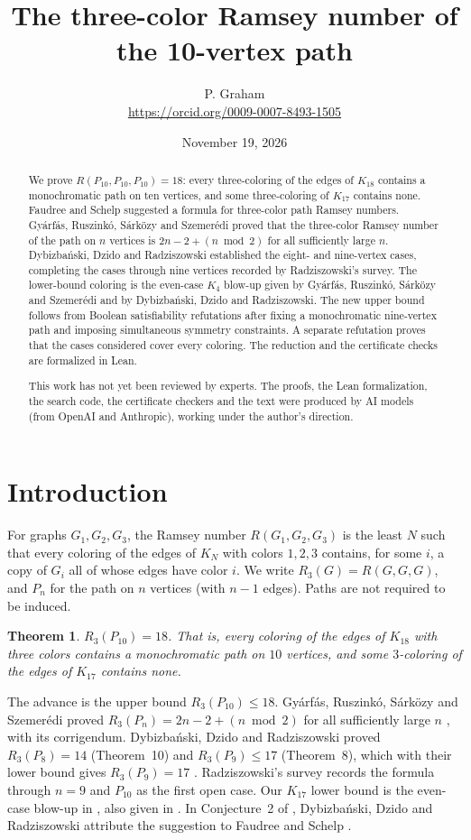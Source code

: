 \documentclass[11pt]{article}
\title{The three-color Ramsey number of the 10-vertex path}
\author{P. Graham\\ \small\url{https://orcid.org/0009-0007-8493-1505}}
\date{November 19, 2026}
\newtheorem{theorem}{Theorem}[section]
\theoremstyle{definition}
\theoremstyle{remark}
\newcommand{\R}{R_3}
\begin{document}
\maketitle
\begin{abstract}
We prove $R(P_{10},P_{10},P_{10})=18$: every three-coloring of the edges
of $K_{18}$ contains a monochromatic path on ten vertices, and some
three-coloring of $K_{17}$ contains none. Faudree and Schelp suggested a
formula for three-color path Ramsey numbers. Gyárfás, Ruszinkó, Sárközy
and Szemerédi proved that the three-color Ramsey number of the path on
$n$ vertices is $2n-2+(n\bmod2)$ for all sufficiently large $n$.
Dybizbański, Dzido and Radziszowski established the eight- and
nine-vertex cases, completing the cases through nine vertices recorded
by Radziszowski's survey. The lower-bound coloring is the even-case
$K_4$ blow-up given by Gyárfás, Ruszinkó, Sárközy and Szemerédi and by
Dybizbański, Dzido and Radziszowski. The new upper bound follows from
Boolean satisfiability refutations after fixing a monochromatic
nine-vertex path and imposing simultaneous symmetry constraints. A
separate refutation proves that the cases considered cover every
coloring. The reduction and the certificate checks are formalized in Lean.

This work has not yet been reviewed by experts.
The proofs, the Lean formalization, the search code, the certificate checkers and the text were produced by AI models (from OpenAI and Anthropic), working under the author's direction.
\end{abstract}

\section{Introduction}
For graphs $G_1,G_2,G_3$, the Ramsey number $R(G_1,G_2,G_3)$ is the least
$N$ such that every coloring of the edges of $K_N$ with colors $1,2,3$
contains, for some $i$, a copy of $G_i$ all of whose edges have color $i$.
We write $\R(G)=R(G,G,G)$, and $P_n$ for the path on $n$ vertices (with
$n-1$ edges). Paths are not required to be induced.

\begin{theorem}\label{thm:main}
$\R(P_{10})=18$. That is, every coloring of the edges of $K_{18}$ with
three colors contains a monochromatic path on $10$ vertices, and some
$3$-coloring of the edges of $K_{17}$ contains none.
\end{theorem}

The advance is the upper bound $\R(P_{10})\le18$.
Gyárfás, Ruszinkó, Sárközy and Szemerédi proved
$\R(P_n)=2n-2+(n\bmod2)$ for all sufficiently large $n$
\cite[Theorem~1]{GRSS07}, with its corrigendum.
Dybizbański, Dzido and Radziszowski proved $\R(P_8)=14$
(Theorem~10) and $\R(P_9)\le17$ (Theorem~8), which with their
lower bound gives $\R(P_9)=17$ \cite{DDR16}.
Radziszowski's survey \cite[Section~6.4, p.~65]{Rad26}
records the formula through $n=9$ and $P_{10}$ as the first open case.
Our $K_{17}$ lower bound is the even-case blow-up in
\cite{GRSS07}, also given in
\cite{DDR16}.
In Conjecture~2 of \cite{DDR16}, Dybizbański, Dzido and Radziszowski
attribute the suggestion to Faudree and Schelp \cite{FS75}.
\end{document}
